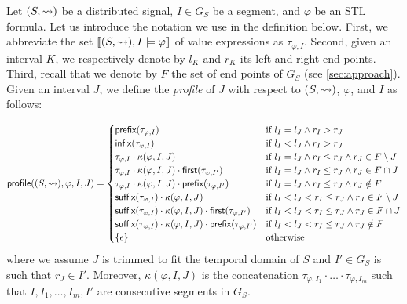 Let $(S,{\rightsquigarrow})$ be a distributed signal, $I \in G_S$ be a segment, and $\varphi$ be an STL formula.
Let us introduce the notation we use in the definition below.
First, we abbreviate the set $\llbracket (S,{\rightsquigarrow}), I \models \varphi \rrbracket$ of value expressions as $\tau_{\varphi,I}$.
Second, given an interval $K$, we respectively denote by $l_K$ and $r_K$ its left and right end points.
Third, recall that we denote by $F$ the set of end points of $G_S$ (see \cref{sec:approach}).
Given an interval $J$, we define the \emph{profile} of $J$ with respect to $(S,{\rightsquigarrow})$, $\varphi$, and 
$I$ as follows: 

\scriptsize
\begin{equation*}
	\mathsf{profile}((S,{\rightsquigarrow}), \varphi, I, J) =
	\begin{cases}
		\textsf{prefix}(\tau_{\varphi,I}) & \text{if } l_I = l_J \land r_I > r_J \\
		\textsf{infix}(\tau_{\varphi,I}) & \text{if } l_I < l_J \land r_I > r_J \\
		\tau_{\varphi,I} \cdot \kappa(\varphi, I, J) & \text{if } l_I = l_J \land r_I \leq r_J \land r_J \in F \setminus J \\
		\tau_{\varphi,I} \cdot \kappa(\varphi, I, J) \cdot \textsf{first}(\tau_{\varphi,I'}) & \text{if } l_I = l_J \land r_I \leq r_J \land r_J \in F \cap J  \\		
		\tau_{\varphi,I} \cdot \kappa(\varphi, I, J) \cdot \textsf{prefix}(\tau_{\varphi,I'}) & \text{if } l_I = l_J \land r_I \leq r_J \land r_J \notin F  \\
		\textsf{suffix}(\tau_{\varphi,I}) \cdot \kappa(\varphi, I, J) & \text{if }  l_I < l_J < r_I \leq r_J \land r_J \in F \setminus J  \\
		\textsf{suffix}(\tau_{\varphi,I}) \cdot \kappa(\varphi, I, J) \cdot \textsf{first}(\tau_{\varphi,I'}) & \text{if } l_I < l_J < r_I \leq r_J \land r_J \in F \cap J \\
		\textsf{suffix}(\tau_{\varphi,I}) \cdot \kappa(\varphi, I, J) \cdot \textsf{prefix}(\tau_{\varphi,I'}) & \text{if } l_I < l_J < r_I \leq r_J \land r_J \notin F \\
		\{\epsilon\} & \text{otherwise}
	\end{cases}
\end{equation*}
\normalsize
where we assume $J$ is trimmed to fit the temporal domain of $S$ and $I' \in G_S$ is such that $r_J \in I'$.
Moreover, $\kappa(\varphi, I, J)$ is the concatenation $\tau_{\varphi,I_1} \cdot \ldots \cdot \tau_{\varphi,I_m}$ such that $I, I_1, \ldots, I_m, I'$ are consecutive segments in $G_S$.
